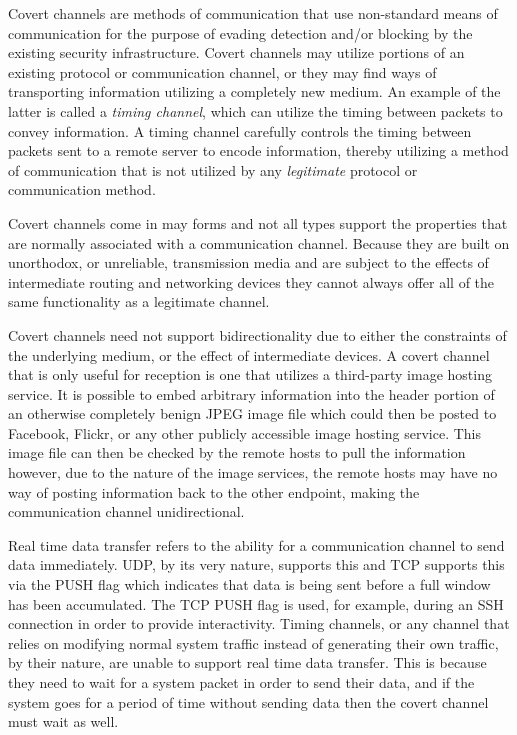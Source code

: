\documentclass[12pt]{article}
\theoremstyle{remark}
\theoremstyle{definition}
\theoremstyle{definition}
\theoremstyle{definition}
\begin{document}
Covert channels are methods of communication that use non-standard means of
communication for the purpose of evading detection and/or blocking by the
existing security infrastructure. Covert channels may utilize
portions of an existing protocol or communication channel, or they may find
ways of transporting information utilizing a completely new medium. An example
of the latter is called a \emph{timing channel}, which can utilize the timing
between packets to convey information. A timing channel carefully controls the
timing between packets sent to a remote server to encode information, thereby
utilizing a method of communication that is not utilized by any
\emph{legitimate} protocol or communication method.

Covert channels come in may forms and not all types support the properties that
are normally associated with a communication channel. Because they are built on
unorthodox, or unreliable, transmission media and are subject to the effects of
intermediate routing and networking devices they cannot always offer all of the
same functionality as a legitimate channel.

Covert channels need not support bidirectionality due
to either the constraints of the underlying medium, or the effect of
intermediate devices. A covert channel that is only useful for reception is one
that utilizes a third-party image hosting service. It is possible to embed
arbitrary information into the header portion of an otherwise completely benign
JPEG image file which could then be posted to Facebook, Flickr, or any other
publicly accessible image hosting service. This image file can then be checked by the remote
hosts to pull the information however, due to the nature of the image services, the remote
hosts may have no
way of posting information back to the other endpoint, making the
communication channel unidirectional.

Real time data transfer refers to the ability
for a communication channel to send data immediately. UDP, by its very nature,
supports this and TCP supports this via the PUSH flag which indicates that data
is being sent before a full window has been accumulated. The TCP PUSH flag
is used, for example, during an SSH connection in order to provide
interactivity. Timing channels, or any channel that relies on modifying normal
system traffic instead of generating their own traffic, by their nature, are
unable to support real time data transfer. This is because they need to wait for
a system packet in order to send their data, and if the system goes for a period
of time without sending data then the covert channel must wait as well.
\end{document}
